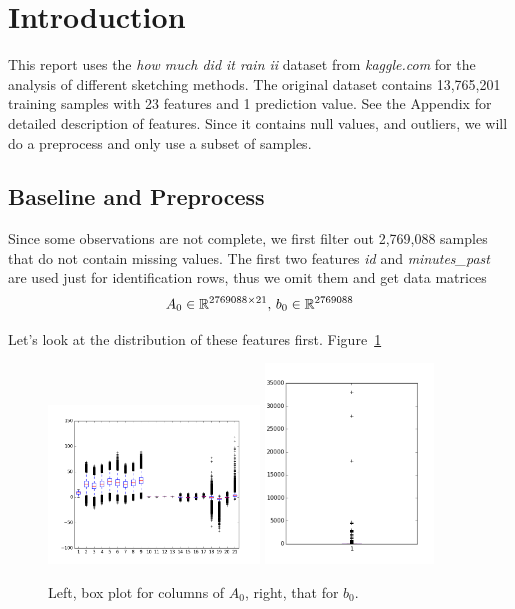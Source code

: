 \section{Introduction}
\label{sec:intro}

This report uses the \emph{how much did it rain ii} \cite{rain, Lakshmanan16}
dataset from \emph{kaggle.com} for the analysis of different sketching methods.
The original dataset contains 13,765,201 training samples
with 23 features and 1 prediction value.
See the Appendix for detailed description of features.
Since it contains null values, and outliers,
we will do a preprocess and only use a subset of samples.

\subsection{Baseline and Preprocess}

Since some observations are not complete,
we first filter out 2,769,088 samples that do not contain missing values.
The first two features \emph{id} and \emph{minutes\_past}
are used just for identification rows,
thus we omit them and
get data matrices
\begin{equation}
    A_0 \in {\mathbb{R}}^{2769088\times 21}, \,
    b_0\in{\mathbb{R}}^{2769088}
\end{equation}

Let's look at the distribution of these features first.
Figure~\ref{fig:box}
\begin{figure}[t]
	\centering
	\includegraphics[width=0.5\textwidth]{fig/box_a_0.png}
	\includegraphics[width=0.4\textwidth]{fig/box_b_0.png}
	\caption{\small
		Left, box plot for columns of $A_0$,
        right, that for $b_0$.}
	\label{fig:box}
\end{figure}
